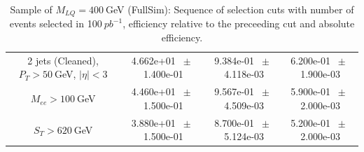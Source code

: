 \begin{table}[htbp]
\begin{center}
\begin{tabular}{|c|c|c|c|}
          2 jets (Cleaned), $P_T>50~$GeV, $ | \eta |<3$          &           4.662e+01          $~\pm~$          1.400e-01           &           9.384e-01          $~\pm~$          4.118e-03           &           6.200e-01          $~\pm~$          1.900e-03          \\          
          $M_{ee}>100~$GeV          &           4.460e+01          $~\pm~$          1.500e-01           &           9.567e-01          $~\pm~$          4.509e-03           &           5.900e-01          $~\pm~$          2.000e-03          \\          
          $ S_T>620~$GeV           &           3.880e+01          $~\pm~$          1.500e-01           &           8.700e-01          $~\pm~$          5.124e-03           &           5.200e-01          $~\pm~$          2.000e-03          \\          
          \hline\hline 
\end{tabular} 
\end{center} 
\caption{Sample of $M_{LQ}=400~$GeV (FullSim): Sequence of selection cuts with number of events selected in 100$~pb^{-1}$, efficiency relative to the preceeding cut and absolute efficiency.} 
\label{tab:effic-MLQ400} 
\end{table} 

